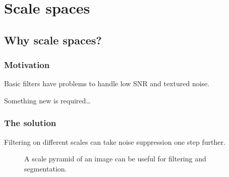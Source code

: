 \documentclass[letterpaper,10pt,english]{sphinxmanual}
\begin{document}
\chapter{Scale spaces}
\label{\detokenize{02-ImageEnhancement:scale-spaces}}

\section{Why scale spaces?}
\label{\detokenize{02-ImageEnhancement:why-scale-spaces}}

\subsection{Motivation}
\label{\detokenize{02-ImageEnhancement:motivation}}
\sphinxAtStartPar
Basic filters have problems to handle low SNR and textured noise.

\sphinxAtStartPar
Something new is required…


\subsection{The solution}
\label{\detokenize{02-ImageEnhancement:the-solution}}
\sphinxAtStartPar
Filtering on different scales can take noise suppression one step further.

\begin{figure}[htbp]
\centering
\capstart

\noindent{}
\caption{A scale pyramid of an image can be useful for filtering and segmentation.}\label{\detokenize{02-ImageEnhancement:id17}}\end{figure}
\end{document}

